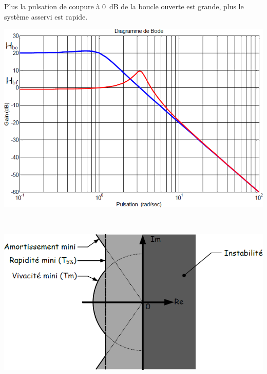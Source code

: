 \documentclass[10pt,fleqn]{article} %
\begin{document}
\noindent\begin{minipage}[c]{.75\linewidth}
\begin{resultat}
Plus la pulsation de coupure à \SI{0}{dB} de la boucle ouverte est grande, plus le système asservi est rapide.
\end{resultat}
\end{minipage} \hfill
\begin{minipage}[c]{.2\linewidth}
\begin{center}
\includegraphics[width=\linewidth]{images/bobf}
\end{center}
\end{minipage}



\begin{resultat}~\\

\begin{center}
\includegraphics[width=.45\linewidth]{images/bilan_poles}
\end{center}

\end{resultat}
\end{document}

